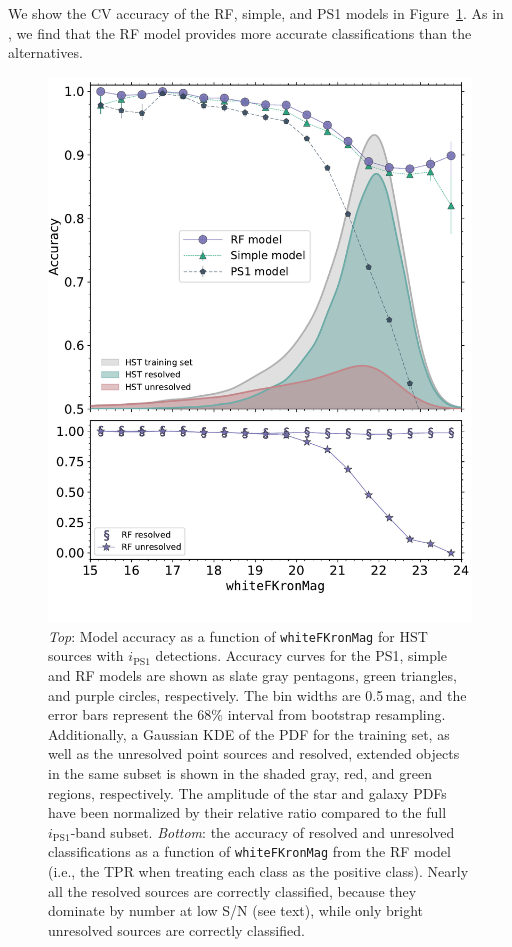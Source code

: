 \documentclass[twocolumn]{aastex63}
\begin{document}


We show the CV accuracy of the RF, simple, and PS1 models in
Figure~\ref{fig:hst_acc}. As in \citet{Tachibana18}, we find that the RF
model provides more accurate classifications than the alternatives.

\begin{figure}[t]
 \centering
  \includegraphics[width=\columnwidth]{./figures/CV_Accuracy_FHST.pdf}
  \caption{\textit{Top}: Model accuracy as a function of
  \texttt{whiteFKronMag} for HST sources with $i_\mathrm{PS1}$ detections.
  Accuracy curves for the PS1, simple and RF models are shown as slate gray
  pentagons, green triangles, and purple circles, respectively. The bin widths
  are 0.5\,mag, and the error bars represent the 68\% interval from bootstrap
  resampling. Additionally, a Gaussian KDE of the PDF for the training set, as
  well as the unresolved point sources and resolved, extended objects in the
  same subset is shown in the shaded gray, red, and green regions,
  respectively. The amplitude of the star and galaxy PDFs have been normalized
  by their relative ratio compared to the full $i_\mathrm{PS1}$-band subset.
  \textit{Bottom}: the accuracy of resolved and unresolved classifications as a
  function of \texttt{whiteFKronMag} from the RF model (i.e., the TPR when
  treating each class as the positive class). Nearly all the resolved sources
  are correctly classified, because they dominate by number at low S/N (see
  text), while only bright unresolved sources are correctly classified.}
  \label{fig:hst_acc}
\end{figure}  
\end{document}
